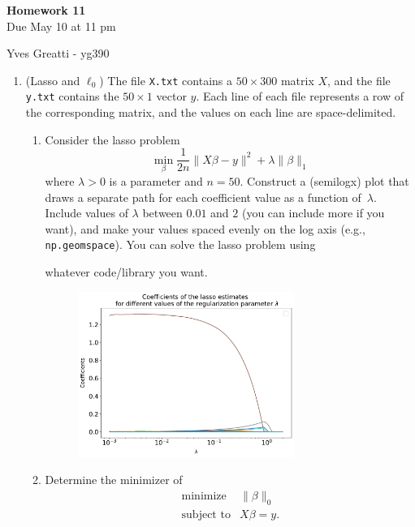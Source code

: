 \documentclass[12pt,twoside]{article}
\begin{document}
\begin{center}
{\large{\textbf{Homework 11}} } \vspace{0.2cm}\\
Due May 10 at 11 pm
\end{center}
Yves Greatti - yg390\\

\begin{enumerate}

\item (Lasso and $\ell_0$)
The file \texttt{X.txt} contains a $50 \times 300$ matrix $X$,
  and the file \texttt{y.txt} contains the $50\times 1$ vector
  $y$.  Each line of each file represents a row of the corresponding
  matrix, and the values on each line are space-delimited.
  \begin{enumerate}
  \item Consider the lasso problem
    $$\min_{\beta} \frac{1}{2n}\|X\beta -y\|^2 + \lambda\|\beta\|_1$$
    where $\lambda>0$ is a parameter and $n=50$.  Construct a (semilogx) plot
    that draws a
    separate path for each coefficient value as a function
    of~$\lambda$.
    Include values of $\lambda$ between $0.01$ and $2$ (you can
    include more if you want),
    and make your values spaced evenly on the log axis (e.g.,
    \texttt{np.geomspace}).  You can solve the lasso problem using

    whatever code/library you want.\\
   	\begin{figure}[H]
		\centering
		\captionsetup{justification=centering}
		\includegraphics[width=200pt]{code/lasso_vs_lo/lasso.pdf}
	\end{figure}
 
  \item Determine the minimizer of
    $$\begin{array}{ll}
    \text{minimize} & \|\beta\|_0\\
    \text{subject to} & X\beta = y.
    \end{array}$$
    

\end{enumerate}
\end{enumerate}
\end{document}
